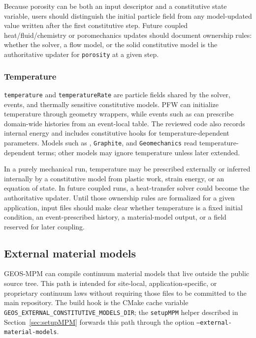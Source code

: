 Because porosity can be both an input descriptor and a constitutive state variable, users should distinguish the initial particle field from any model-updated value written after the first constitutive step.  Future coupled heat/fluid/chemistry or poromechanics updates should document ownership rules: whether the solver, a flow model, or the solid constitutive model is the authoritative updater for \texttt{porosity} at a given step.

\subsubsection{Temperature}
\label{subsubsec:constitutive-temperature}

\texttt{temperature} and \texttt{temperatureRate} are particle fields shared by the solver, events, and thermally sensitive constitutive models.  PFW can initialize temperature through geometry wrappers, while events such as  can prescribe domain-wide histories from an event-local table.  The reviewed code also records internal energy and includes constitutive hooks for temperature-dependent parameters.  Models such as , \texttt{Graphite}, and \texttt{Geomechanics} read temperature-dependent terms; other models may ignore temperature unless later extended.

In a purely mechanical run, temperature may be prescribed externally or inferred internally by a constitutive model from plastic work, strain energy, or an equation of state.  In future coupled runs, a heat-transfer solver could become the authoritative updater.  Until those ownership rules are formalized for a given application, input files should make clear whether temperature is a fixed initial condition, an event-prescribed history, a material-model output, or a field reserved for later coupling.

\subsection{External material models}
\label{subsec:external-material-models}

GEOS-MPM can compile continuum material models that live outside the public source tree.  This path is intended for site-local, application-specific, or proprietary continuum laws without requiring those files to be committed to the main repository.  The build hook is the CMake cache variable \texttt{GEOS\_EXTERNAL\_CONSTITUTIVE\_MODELS\_DIR}; the \texttt{setupMPM} helper described in Section~\ref{sec:setupMPM} forwards this path through the option \texttt{--external-material-models}.

